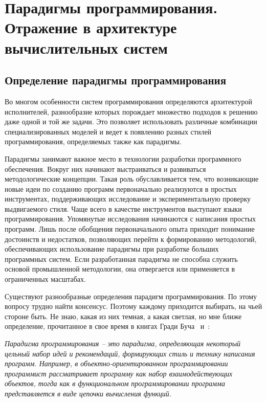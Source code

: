 
\chapter{Парадигмы программирования. Отражение в архитектуре вычислительных систем}

\section{Определение парадигмы программирования}

Во многом особенности систем программирования определяются архитектурой исполнителей, разнообразие которых порождает множество подходов к решению даже одной и той же задачи. Это позволяет использовать различные комбинации специализированных моделей и ведет к появлению разных стилей программирования, определяемых также как парадигмы.

Парадигмы занимают важное место в технологии разработки программного обеспечения. Вокруг них начинают выстраиваться и развиваться методологические концепции. Такая роль обуславливается тем, что возникающие новые идеи по созданию программ первоначально реализуются в простых инструментах, поддерживающих исследование и экспериментальную проверку выдвигаемого стиля. Чаще всего в качестве инструментов выступают языки программирования. Упомянутые исследования начинаются с написания простых программ. Лишь после обобщения первоначального опыта приходит понимание достоинств и недостатков, позволяющих перейти к формированию методологий, обеспечивающих использование парадигмы при разработке больших программных систем. Если разработанная парадигма не способна служить основой промышленной методологии, она отвергается или применяется в ограниченных масштабах.

Существуют разнообразные определения парадигм программирования. По этому вопросу трудно найти консенсус. Поэтому каждому приходится выбирать, на чьей стороне быть. Не знаю, какая из них темная, а какая светлая, но мне ближе определение, прочитанное в свое время в книгах Гради Буча~\cite{Booch92} и~\cite{Booch98}:

\textit{Парадигма программирования – это парадигма, определяющая некоторый цельный набор идей и рекомендаций, формирующих стиль и технику написания программ. Например, в объектно-ориентированном программировании программист рассматривает программу как набор взаимодействующих объектов, тогда как в функциональном программировании программа представляется в виде цепочки вычисления функций.}

